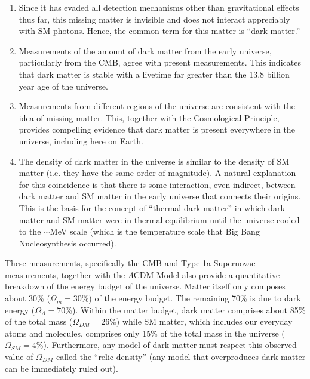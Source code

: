 \begin{enumerate}
  \item Since it has evaded all detection mechanisms other than gravitational effects thus far, this missing matter is invisible and does not interact appreciably with SM photons. Hence, the common term for this matter is ``dark matter.''
  \item Measurements of the amount of dark matter from the early universe, particularly from the CMB, agree with present measurements. This indicates that dark matter is stable with a livetime far greater than the 13.8 billion year age of the universe.
  \item Measurements from different regions of the universe are consistent with the idea of missing matter. This, together with the Cosmological Principle, provides compelling evidence that dark matter is present everywhere in the universe, including here on Earth.
  \item The density of dark matter in the universe is similar to the density of SM matter (i.e. they have the same order of magnitude). A natural explanation for this coincidence is that there is some interaction, even indirect, between dark matter and SM matter in the early universe that connects their origins. This is the basis for the concept of ``thermal dark matter'' in which dark matter and SM matter were in thermal equilibrium until the universe cooled to the $\sim$MeV scale (which is the temperature scale that Big Bang Nucleosynthesis occurred).
\end{enumerate}

These measurements, specifically the CMB and Type 1a Supernovae measurements, together with the $\Lambda$CDM Model also provide a quantitative breakdown of the energy budget of the universe. Matter itself only composes about 30\% ($\Omega_m=30$\%) of the energy budget. The remaining 70\% is due to dark energy ($\Omega_{\Lambda}=70$\%). Within the matter budget, dark matter comprises about 85\% of the total mass ($\Omega_{DM}=26$\%) while SM matter, which includes our everyday atoms and molecules, comprises only 15\% of the total mass in the universe ($\Omega_{SM}=4$\%). Furthermore, any model of dark matter must respect this observed value of $\Omega_{DM}$ called the ``relic density'' (any model that overproduces dark matter can be immediately ruled out).

\clearpage


